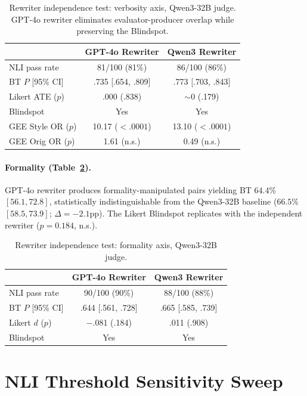 \begin{table}[h]
\centering
\small
\caption{Rewriter independence test: verbosity axis, Qwen3-32B judge. GPT-4o rewriter eliminates evaluator-producer overlap while preserving the Blindspot.}
\label{tab:rewriter_indep}
\begin{tabular}{lcc}
\toprule
 & GPT-4o Rewriter & Qwen3 Rewriter \\
\midrule
NLI pass rate & 81/100 (81\%) & 86/100 (86\%) \\
BT $P$ [95\% CI] & .735 [.654, .809] & .773 [.703, .843] \\
Likert ATE ($p$) & .000 (.838) & ${\sim}$0 (.179) \\
Blindspot & Yes & Yes \\
GEE Style OR ($p$) & 10.17 (${<}.0001$) & 13.10 (${<}.0001$) \\
GEE Orig OR ($p$) & 1.61 (n.s.) & 0.49 (n.s.) \\
\bottomrule
\end{tabular}
\end{table}

\paragraph{Formality (Table~\ref{tab:rewriter_indep_form}).}
GPT-4o rewriter produces formality-manipulated pairs yielding BT $64.4\%$ $[56.1, 72.8]$, statistically indistinguishable from the Qwen3-32B baseline ($66.5\%$ $[58.5, 73.9]$; $\Delta = -2.1$pp).
The Likert Blindspot replicates with the independent rewriter ($p = 0.184$, n.s.).

\begin{table}[h]
\centering
\small
\caption{Rewriter independence test: formality axis, Qwen3-32B judge.}
\label{tab:rewriter_indep_form}
\begin{tabular}{lcc}
\toprule
 & GPT-4o Rewriter & Qwen3 Rewriter \\
\midrule
NLI pass rate & 90/100 (90\%) & 88/100 (88\%) \\
BT $P$ [95\% CI] & .644 [.561, .728] & .665 [.585, .739] \\
Likert $d$ ($p$) & $-$.081 (.184) & .011 (.908) \\
Blindspot & Yes & Yes \\
\bottomrule
\end{tabular}
\end{table}

\section{NLI Threshold Sensitivity Sweep}
\label{app:nli_sweep}

